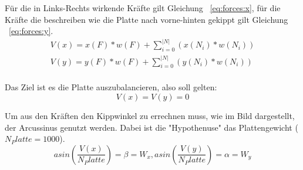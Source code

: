 F{\"{u}}r die in Links-Rechts wirkende Kr{\"{a}}fte gilt Gleichung ~\ref{eq:forces:x}, f{\"{u}}r die Kr{\"{a}}fte die beschreiben wie die Platte nach vorne-hinten gekippt gilt Gleichung ~\ref{eq:forces:y}.
\begin{subequations}\label{eq:forces}
\begin{align}
	V(x) = x(F) * w(F) + \sum_{i=0}^{|N|} ( x(N_i) * w(N_i) ) \label{eq:forces:x}\\
	V(y) = y(F) * w(F) + \sum_{i=0}^{|N|} ( y(N_i) * w(N_i) ) \label{eq:forces:y}\\
\end{align}
\end{subequations}

Das Ziel ist es die Platte auszubalancieren, also soll gelten:
\begin{equation}\label{eq:gleichgewicht}
	V(x) = V(y) = 0
\end{equation}

Um aus den Kr{\"{a}}ften den Kippwinkel zu errechnen muss, wie im Bild dargestellt, der Arcussinus genutzt werden. Dabei ist die "Hypothenuse" das Plattengewicht ($ N_Platte = 1000$). 
$$ asin(\frac{V(x)}{ N_Platte}) = \beta = W_{x}, asin(\frac{V(y)}{N_Platte}) = \alpha = W_{y} $$


